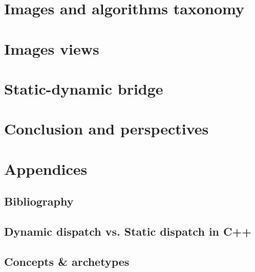 \documentclass[11pt]{book}
\begin{document}


\cleardoublepage


\part{Images and algorithms taxonomy}
\label{part.image_and_algorithms_taxonomy}



\cleardoublepage


\part{Images views}
\label{part.image_views}



\cleardoublepage


\part{Static-dynamic bridge}
\label{part.static_dynamic_bridge}



\cleardoublepage


\part{Conclusion and perspectives}
\label{part.conclusion_and_perspecitves}



\cleardoublepage


\part{Appendices}
\label{part.annexes}

\appendix

\chapter{Bibliography}
\label{chap.bibliography}




\chapter{Dynamic dispatch vs. Static dispatch in C++}
\label{appendix.dispatch.dyn.static}



\chapter{Concepts \& archetypes}
\label{appendix.concepts.and.archetypes}


\end{document}
